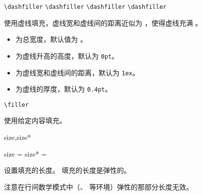 \documentclass{cusdoc}
\begin{document}
\begin{function}{\dashfiller}
  \begin{syntax}
    \verb|\dashfiller|
    \verb|\dashfiller| 
    \verb|\dashfiller| 
    \verb|\dashfiller|  
  \end{syntax}
使用虚线填充，虚线宽和虚线间的距离近似为 ，使得虚线充满 。

\begin{itemize}[nosep]
  \item {} 为总宽度，默认值为 。
  \item {} 为虚线升高的高度，默认为 \texttt{0pt}。
  \item {} 为虚线宽和虚线间的距离，默认为 \texttt{1ex}。
  \item {} 为虚线的厚度，默认为 \texttt{0.4pt}。
\end{itemize}
\end{function}

\begin{xample}
\noindent\llap{|}\dashfiller \par %
\noindent\llap{|}\dashfiller [.5ex] \par %
\noindent\llap{|}\dashfiller [.5ex][3pt] \par 
\stopxamplecode
\xampleprint 
\end{xample}

\begin{function}{\filler}
  \begin{syntax}
    \verb|\filler| 
  \end{syntax}
使用给定内容填充。
\end{function}

\begin{keyval}[path=filler]{size,size*}
  \begin{syntax}
    size  = 
    size* = 
  \end{syntax}
设置填充的长度。 填充的长度是弹性的。

注意在行间数学模式中（、 等环境）弹性的那部分长度无效。
\end{keyval}
\end{document}
